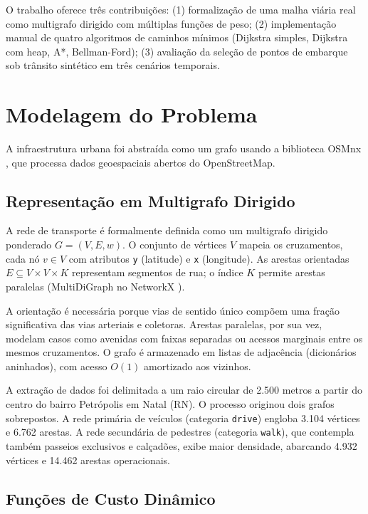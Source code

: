 \documentclass[conference]{IEEEtran}
\begin{document}
O trabalho oferece três contribuições: (1) formalização de uma malha viária real como multigrafo dirigido com múltiplas funções de peso; (2) implementação manual de quatro algoritmos de caminhos mínimos (Dijkstra simples, Dijkstra com heap, A*, Bellman-Ford); (3) avaliação da seleção de pontos de embarque sob trânsito sintético em três cenários temporais.

\section{Modelagem do Problema}

A infraestrutura urbana foi abstraída como um grafo usando a biblioteca OSMnx \cite{osmnx}, que processa dados geoespaciais abertos do OpenStreetMap.

\subsection{Representação em Multigrafo Dirigido}

A rede de transporte é formalmente definida como um multigrafo dirigido ponderado $G = (V, E, w)$. O conjunto de vértices $V$ mapeia os cruzamentos, cada nó $v \in V$ com atributos \texttt{y} (latitude) e \texttt{x} (longitude). As arestas orientadas $E \subseteq V \times V \times K$ representam segmentos de rua; o índice $K$ permite arestas paralelas (MultiDiGraph no NetworkX \cite{networkx}).

A orientação é necessária porque vias de sentido único compõem uma fração significativa das vias arteriais e coletoras. Arestas paralelas, por sua vez, modelam casos como avenidas com faixas separadas ou acessos marginais entre os mesmos cruzamentos. O grafo é armazenado em listas de adjacência (dicionários aninhados), com acesso $O(1)$ amortizado aos vizinhos.

A extração de dados foi delimitada a um raio circular de 2.500 metros a partir do centro do bairro Petrópolis em Natal (RN). O processo originou dois grafos sobrepostos. A rede primária de veículos (categoria \texttt{drive}) engloba 3.104 vértices e 6.762 arestas. A rede secundária de pedestres (categoria \texttt{walk}), que contempla também passeios exclusivos e calçadões, exibe maior densidade, abarcando 4.932 vértices e 14.462 arestas operacionais.

\subsection{Funções de Custo Dinâmico}
\end{document}
